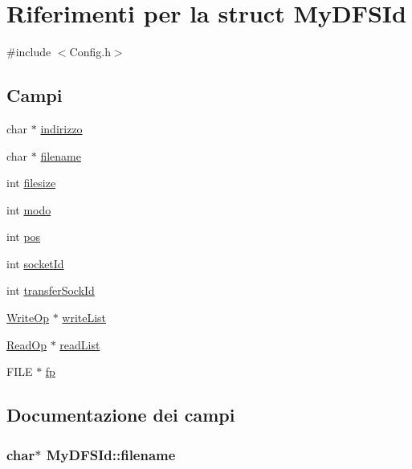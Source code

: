 \hypertarget{structMyDFSId}{\section{Riferimenti per la struct My\+D\+F\+S\+Id}
\label{structMyDFSId}
}


{\ttfamily \#include $<$Config.\+h$>$}

\subsection*{Campi}
\begin{DoxyCompactItemize}
\item 
char $\ast$ \hyperlink{structMyDFSId_ac8c10a1a5b18776bf5e5585ee9e26331}{indirizzo}
\item 
char $\ast$ \hyperlink{structMyDFSId_ac0e1b8c96d859982c1a7d49f9e929e48}{filename}
\item 
int \hyperlink{structMyDFSId_a2b7cf19c5ac22e03ae8abf7e688fee2a}{filesize}
\item 
int \hyperlink{structMyDFSId_a98bc5ce1a7734459d8b81c997da4e9f0}{modo}
\item 
int \hyperlink{structMyDFSId_aaeac229fb85c313f91a76f00be916832}{pos}
\item 
int \hyperlink{structMyDFSId_a382a74f109962751085cea7aac2892cc}{socket\+Id}
\item 
int \hyperlink{structMyDFSId_a3b62a6d0f52a871bda4bf9cd56c57ff7}{transfer\+Sock\+Id}
\item 
\hyperlink{structWriteOp}{Write\+Op} $\ast$ \hyperlink{structMyDFSId_a0f7d2a9c60ddc649ee7e65b8b9295432}{write\+List}
\item 
\hyperlink{structReadOp}{Read\+Op} $\ast$ \hyperlink{structMyDFSId_a8a4360512d45c22b6d8e980967c7dd32}{read\+List}
\item 
F\+I\+L\+E $\ast$ \hyperlink{structMyDFSId_ae2badd91d3b506420a9e49554df8212d}{fp}
\end{DoxyCompactItemize}


\subsection{Documentazione dei campi}
\hypertarget{structMyDFSId_ac0e1b8c96d859982c1a7d49f9e929e48}{
\subsubsection[{filename}]{\setlength{\rightskip}{0pt plus 5cm}char$\ast$ My\+D\+F\+S\+Id\+::filename}}\label{structMyDFSId_ac0e1b8c96d859982c1a7d49f9e929e48}



